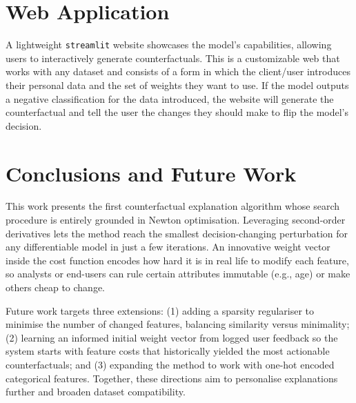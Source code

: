 \documentclass[12pt]{extarticle}
\numberwithin{equation}{section}
\begin{document}
\section*{Web Application}
A lightweight \texttt{streamlit} website showcases the model's capabilities, allowing users to interactively generate counterfactuals. This is a customizable web that works with any dataset and consists of a form in which the client/user introduces their personal data and the set of weights they want to use. If the model outputs a negative classification for the data introduced, the website will generate the counterfactual and tell the user the changes they should make to flip the model's decision.

\section*{Conclusions and Future Work} 
This work presents the first counterfactual explanation algorithm whose search procedure is entirely grounded in Newton optimisation. Leveraging second-order derivatives lets the method reach the smallest decision-changing perturbation for any differentiable model in just a few iterations. An innovative weight vector inside the cost function encodes how hard it is in real life to modify each feature, so analysts or end-users can rule certain attributes immutable (e.g., age) or make others cheap to change.

Future work targets three extensions: (1) adding a sparsity regulariser to minimise the number of changed features, balancing similarity versus minimality; (2) learning an informed initial weight vector from logged user feedback so the system starts with feature costs that historically yielded the most actionable counterfactuals; and (3) expanding the method to work with one-hot encoded categorical features. Together, these directions aim to personalise explanations further and broaden dataset compatibility.

\newpage
\setcounter{page}{1}
\fancyfoot[C]{
    \begin{center}
        \thepage
    \end{center}
} 
\renewcommand{\footrulewidth}{0.4pt}
\setlength{\footskip}{0.8cm}
\end{document}
